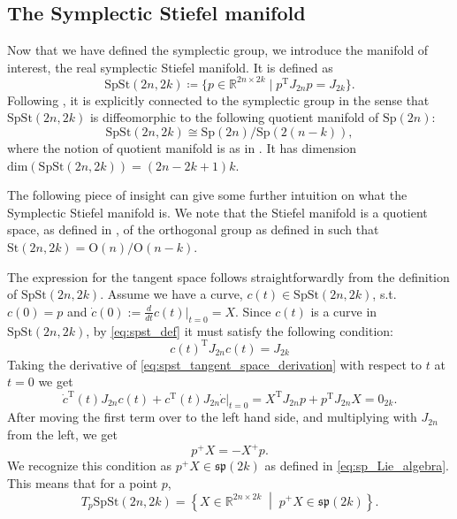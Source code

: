 \subsection{The Symplectic Stiefel manifold}
Now that we have defined the symplectic group, we introduce the manifold of interest, the real symplectic Stiefel manifold. It is defined as
\begin{equation}\label{eq:spst_def}
    \mathrm{SpSt}(2n, 2k)\coloneqq \{p\in \mathbb{R}^{2n\times2k} \;|\; p ^{\mathrm{T}}J_{2n}p=J_{2k}\}.
\end{equation}
Following \cite[Prop.~3.1]{BendokatZimmermann2021}, it is explicitly connected to the symplectic group in the sense that $\mathrm{SpSt}(2n, 2k)$ is diffeomorphic to the following quotient manifold of $\mathrm{Sp}(2n)$:
\begin{equation*}
    \mathrm{SpSt}(2n, 2k)\cong \mathrm{Sp}(2n)/\mathrm{Sp}(2(n-k)),
\end{equation*}
where the notion of quotient manifold is as in . It has dimension $\mathrm{dim}(\mathrm{SpSt}(2n, 2k))=(2n-2k+1)k$. 

The following piece of insight can give some further intuition on what the Symplectic Stiefel manifold is. We note that the Stiefel manifold is a quotient space, as defined in , of the orthogonal group as defined in  such that $\mathrm{St}(2n, 2k)=\mathrm{O}(n)/\mathrm{O}(n-k)$. 

The expression for the tangent space follows straightforwardly from the definition of $\mathrm{SpSt}(2n, 2k)$. Assume we have a curve, $c(t)\in \mathrm{SpSt}(2n,2k)$, s.t. $c(0)=p$ and $\dot{c}(0):=\tfrac{d}{dt}c(t)|_{t=0}=X$. Since $c(t)$ is a curve in $\mathrm{SpSt}(2n,2k)$, by \eqref{eq:spst_def} it must satisfy the following condition:
\begin{equation}\label{eq:spst_tangent_space_derivation}
    c(t) ^{\mathrm{T}}J_{2n}c(t)=J_{2k}
\end{equation}
Taking the derivative of \eqref{eq:spst_tangent_space_derivation} with respect to $t$ at $t=0$ we get
\begin{equation*}
    \dot{c}^{\mathrm{T}}(t)J_{2n}c(t)+c^{\mathrm{T}}(t)J_{2n}\dot{c}\big|_{t=0}=X ^{\mathrm{T}}J_{2n}p+p ^{\mathrm{T}}J_{2n}X=0_{2k}.
\end{equation*}
After moving the first term over to the left hand side, and multiplying with $J_{2n}$ from the left, we get
\begin{equation*}
    p^{+}X=-X^{+}p.
\end{equation*}
We recognize this condition as $p^{+}X\in \mathfrak{sp}(2k)$ as defined in \eqref{eq:sp_Lie_algebra}. This means that for a point $p$, 
\begin{equation}\label{eq:spst_tangent_space}
    T_{p}\mathrm{SpSt}(2n,2k)=\left\{X\in \mathbb{R}^{2n\times2k}\;\middle|\;p^{+}X\in\mathfrak{sp}(2k)\right\}.
\end{equation}
